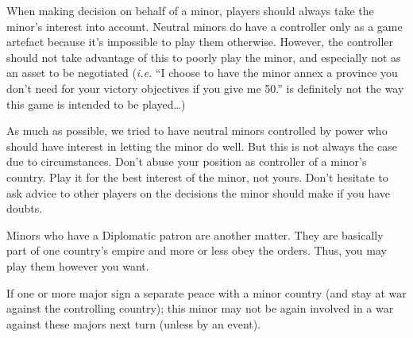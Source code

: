 \begin{designnote}
  When making decision on behalf of a minor, players should always take the
  minor's interest into account. Neutral minors do have a controller only as a
  game artefact because it's impossible to play them otherwise. However, the
  controller should not take advantage of this to poorly play the minor, and
  especially not as an asset to be negotiated (\emph{i.e.} ``I choose to have
  the minor annex a province you don't need for your victory objectives if you
  give me 50\ducats.'' is definitely not the way this game is intended to be
  played\ldots)

  As much as possible, we tried to have neutral minors controlled by power who
  should have interest in letting the minor do well. But this is not always
  the case due to circumstances. Don't abuse your position as controller of a
  minor's country. Play it for the best interest of the minor, not
  yours. Don't hesitate to ask advice to other players on the decisions the
  minor should make if you have doubts.

  Minors who have a Diplomatic patron are another matter. They are basically
  part of one country's empire and more or less obey the orders. Thus, you may
  play them however you want.
\end{designnote}

If one or more major sign a separate peace with a minor country (and stay at
war against the controlling country); this minor may not be again involved in
a war against these majors next turn (unless by an event).





